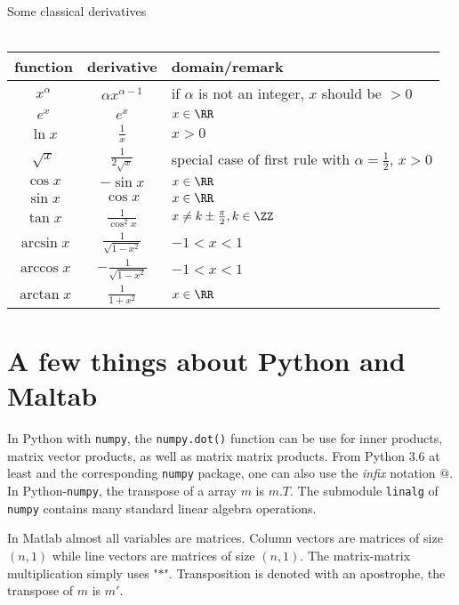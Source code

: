 \documentclass[a4paper,10pt]{article}
\begin{document}
\begin{center}
Some classical derivatives\\
~\\
  \begin{tabular}{|c|c|l|}
    \hline
    function & derivative & domain/remark \\\hline
    $x^\alpha$ & $\alpha x^{\alpha -1}$ & if $\alpha$ is not an integer, $x$ should be $> 0$\\
    \hline
    $e^x$ & $e^x$& $x\in \RR$\\
    \hline
    $\ln x$ &$\frac1x$ & $x > 0$\\
    \hline
    $\sqrt{x}$ & $\frac1{2\sqrt{x}}$ & special case of first rule with $\alpha = \frac12$, $x>0$\\
    \hline
    $\cos x$ & $-\sin x$ &$x\in \RR$\\
    \hline
    $\sin x$ & $\cos x$ & $x\in \RR$\\
    \hline
    $\tan x$ & $\frac1{\cos^2 x}$ &  $x\not= k\pm\frac\pi2,k\in \ZZ$\\
    \hline
    $\arcsin x$ & $\frac1{\sqrt{1-x^2}}$ & $-1<x<1$\\
    \hline
    $\arccos x$ & $-\frac1{\sqrt{1-x^2}}$ & $-1<x<1$\\
    \hline
    $\arctan x$ & $\frac1{1+x^2}$ &$x\in \RR$\\
    \hline
  \end{tabular}
  \bigskip
\end{center}
  
\section{A few things about Python and Maltab}
In Python with \texttt{numpy},  the \texttt{numpy.dot()} function can be use for inner products, matrix vector products, as well as matrix matrix products. From Python $3.6$ at least and the corresponding \texttt{numpy} package,
one can also use the \emph{infix} notation $@$.  In Python-\texttt{numpy}, the transpose of a array $m$ is $m.T$.
The submodule \texttt{linalg} of \texttt{numpy} contains many standard linear algebra operations.

In Matlab almost all variables are matrices. Column vectors are matrices of size $(n,1)$ while line vectors are matrices of size $(n,1)$. The matrix-matrix multiplication simply uses "$*$". Transposition is denoted with an apostrophe,
the transpose of $m$ is $m'$.
\end{document}
